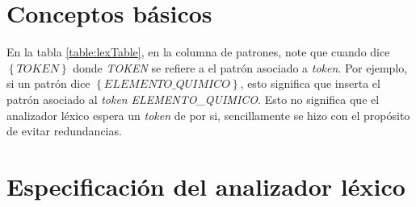 \section{Conceptos básicos}

En la tabla \ref{table:lexTable}, en la columna de patrones, note que cuando dice $\left\{\textit{TOKEN}\right\}$ donde \textit{TOKEN} se refiere a el patrón asociado a \textit{token}.
Por ejemplo, si un patrón dice $\left\{\textit{ELEMENTO\_QUIMICO}\right\}$, esto significa que inserta el patrón asociado al \textit{token} \textit{ELEMENTO\_QUIMICO}.
Esto no significa que el analizador léxico espera un \textit{token} de por si, sencillamente se hizo con el propósito de evitar redundancias.

\newpage

\section{Especificación del analizador léxico}

